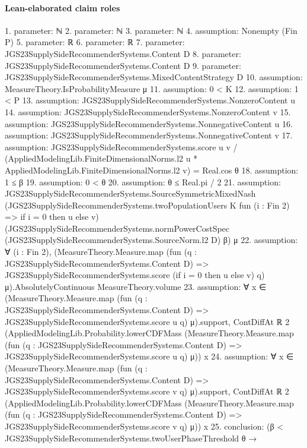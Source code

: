 \documentclass[10pt]{article}
\begin{document}
\paragraph{Lean-elaborated claim roles}\begin{ReviewVerbatim}
1. parameter: ℕ
2. parameter: ℕ
3. parameter: ℕ
4. assumption: Nonempty (Fin P)
5. parameter: ℝ
6. parameter: ℝ
7. parameter: JGS23SupplySideRecommenderSystems.Content D
8. parameter: JGS23SupplySideRecommenderSystems.Content D
9. parameter: JGS23SupplySideRecommenderSystems.MixedContentStrategy D
10. assumption: MeasureTheory.IsProbabilityMeasure μ
11. assumption: 0 < K
12. assumption: 1 < P
13. assumption: JGS23SupplySideRecommenderSystems.NonzeroContent u
14. assumption: JGS23SupplySideRecommenderSystems.NonzeroContent v
15. assumption: JGS23SupplySideRecommenderSystems.NonnegativeContent u
16. assumption: JGS23SupplySideRecommenderSystems.NonnegativeContent v
17. assumption: JGS23SupplySideRecommenderSystems.score u v /
    (AppliedModelingLib.FiniteDimensionalNorms.l2 u * AppliedModelingLib.FiniteDimensionalNorms.l2 v) =
  Real.cos θ
18. assumption: 1 ≤ β
19. assumption: 0 < θ
20. assumption: θ ≤ Real.pi / 2
21. assumption: JGS23SupplySideRecommenderSystems.SourceSymmetricMixedNash
  (JGS23SupplySideRecommenderSystems.twoPopulationUsers K fun (i : Fin 2) => if i = 0 then u else v)
  (JGS23SupplySideRecommenderSystems.normPowerCostSpec (JGS23SupplySideRecommenderSystems.SourceNorm.l2 D) β) μ
22. assumption: ∀ (i : Fin 2),
  (MeasureTheory.Measure.map
        (fun (q : JGS23SupplySideRecommenderSystems.Content D) =>
          JGS23SupplySideRecommenderSystems.score (if i = 0 then u else v) q)
        μ).AbsolutelyContinuous
    MeasureTheory.volume
23. assumption: ∀
  x ∈
    (MeasureTheory.Measure.map
        (fun (q : JGS23SupplySideRecommenderSystems.Content D) => JGS23SupplySideRecommenderSystems.score u q)
        μ).support,
  ContDiffAt ℝ 2
    (AppliedModelingLib.Probability.lowerCDFMass
      (MeasureTheory.Measure.map
        (fun (q : JGS23SupplySideRecommenderSystems.Content D) => JGS23SupplySideRecommenderSystems.score u q) μ))
    x
24. assumption: ∀
  x ∈
    (MeasureTheory.Measure.map
        (fun (q : JGS23SupplySideRecommenderSystems.Content D) => JGS23SupplySideRecommenderSystems.score v q)
        μ).support,
  ContDiffAt ℝ 2
    (AppliedModelingLib.Probability.lowerCDFMass
      (MeasureTheory.Measure.map
        (fun (q : JGS23SupplySideRecommenderSystems.Content D) => JGS23SupplySideRecommenderSystems.score v q) μ))
    x
25. conclusion: (β < JGS23SupplySideRecommenderSystems.twoUserPhaseThreshold θ →

\end{ReviewVerbatim}
\end{document}
